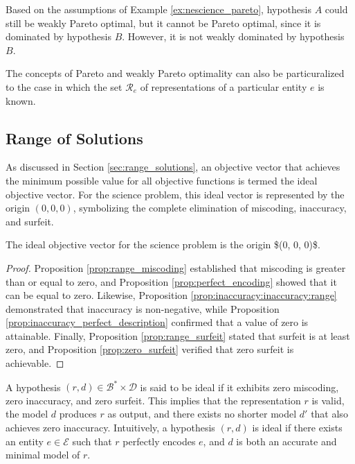 \begin{example}
Based on the assumptions of Example \ref{ex:nescience_pareto}, hypothesis $A$ could still be weakly Pareto optimal, but it cannot be Pareto optimal, since it is dominated by hypothesis $B$. However, it is not weakly dominated by hypothesis $B$.
\end{example}

The concepts of Pareto and weakly Pareto optimality can also be particuralized to the case in which the set $\mathcal{R}_e$ of representations of a particular entity $e$ is known.


\subsection*{Range of Solutions}

As discussed in Section \ref{sec:range_solutions}, an objective vector that achieves the minimum possible value for all objective functions is termed the ideal objective vector. For the science problem, this ideal vector is represented by the origin $(0, 0, 0)$, symbolizing the complete elimination of miscoding, inaccuracy, and surfeit.

\begin{proposition}
The ideal objective vector for the science problem is the origin \$(0, 0, 0)\$.
\end{proposition}
\begin{proof}
Proposition \ref{prop:range_miscoding} established that miscoding is greater than or equal to zero, and Proposition \ref{prop:perfect_encoding} showed that it can be equal to zero. Likewise, Proposition \ref{prop:inaccuracy:inaccuracy:range} demonstrated that inaccuracy is non-negative, while Proposition \ref{prop:inaccuracy_perfect_description} confirmed that a value of zero is attainable. Finally, Proposition \ref{prop:range_surfeit} stated that surfeit is at least zero, and Proposition \ref{prop:zero_surfeit} verified that zero surfeit is achievable.
\end{proof}

A hypothesis $(r, d) \in \mathcal{B}^\ast \times \mathcal{D}$ is said to be ideal if it exhibits zero miscoding, zero inaccuracy, and zero surfeit. This implies that the representation $r$ is valid, the model $d$ produces $r$ as output, and there exists no shorter model $d'$ that also achieves zero inaccuracy. Intuitively, a hypothesis $(r, d)$ is ideal if there exists an entity $e \in \mathcal{E}$ such that $r$ perfectly encodes $e$, and $d$ is both an accurate and minimal model of $r$.

